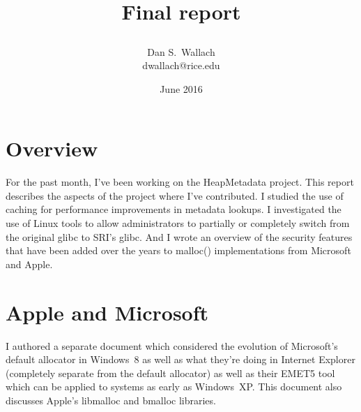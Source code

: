 \documentclass[12pt,onecolumn]{article}
\let\oldnewcommand=\newcommand
\let\newcommand=\providecommand
\let\newcommand=\oldnewcommand
\begin{document}
\newcommand{\CompTitle}{{\fontsize{22}{18}\kern0pt\fontfamily{pag}\selectfont{HeapMetadata:}}}                                                                       

\newcommand{\thetitle}{\CompTitle{}\\
\vspace{-2pt}

{\fontsize{16}{12}\fontfamily{pag}\selectfont Final report}}



\newcommand{\authorlist}{Dan S.~Wallach}
\newcommand{\authoremails}{dwallach@rice.edu}


\title{\thetitle}
\author{\authorlist\\\smaller\authoremails}
\date{June 2016}
\maketitle

\section*{Overview}
For the past month, I've been working on the HeapMetadata project. This report describes the aspects of the project where I've contributed.  I studied the use of caching for performance improvements in metadata lookups.  I investigated the use of Linux tools to allow administrators to partially or completely switch from the original glibc to SRI's glibc. And I wrote an overview of the security features that have been added over the years to {\sf malloc()} implementations from Microsoft and Apple.




\section{Apple and Microsoft}

I authored a separate document which considered the evolution of Microsoft's default allocator in Windows~8 as well as what they're doing in Internet Explorer (completely separate from the default allocator) as well as their EMET5 tool which can be applied to systems as early as Windows~XP. This document also discusses Apple's {\sf libmalloc} and {\sf bmalloc} libraries.
\end{document}

